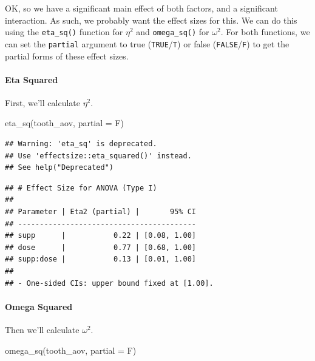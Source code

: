 \documentclass[
]{book}
\newenvironment{Shaded}{\begin{snugshade}}{\end{snugshade}}
\newcommand{\AttributeTok}[1]{\textcolor[rgb]{0.77,0.63,0.00}{#1}}
\newcommand{\FunctionTok}[1]{\textcolor[rgb]{0.00,0.00,0.00}{#1}}
\newcommand{\NormalTok}[1]{#1}
\begin{document}
OK, so we have a significant main effect of both factors, and a significant interaction. As such, we probably want the effect sizes for this. We can do this using the \texttt{eta\_sq()} function for \(\eta^2\) and \texttt{omega\_sq()} for \(\omega^2\). For both functions, we can set the \texttt{partial} argument to true (\texttt{TRUE}/\texttt{T}) or false (\texttt{FALSE}/\texttt{F}) to get the partial forms of these effect sizes.

\hypertarget{eta-squared}{%
\paragraph{Eta Squared}\label{eta-squared}}

First, we'll calculate \(\eta^2\).

\begin{Shaded}
\begin{Highlighting}[]
\FunctionTok{eta\_sq}\NormalTok{(tooth\_aov, }\AttributeTok{partial =}\NormalTok{ F)}
\end{Highlighting}
\end{Shaded}

\begin{verbatim}
## Warning: 'eta_sq' is deprecated.
## Use 'effectsize::eta_squared()' instead.
## See help("Deprecated")
\end{verbatim}

\begin{verbatim}
## # Effect Size for ANOVA (Type I)
## 
## Parameter | Eta2 (partial) |       95% CI
## -----------------------------------------
## supp      |           0.22 | [0.08, 1.00]
## dose      |           0.77 | [0.68, 1.00]
## supp:dose |           0.13 | [0.01, 1.00]
## 
## - One-sided CIs: upper bound fixed at [1.00].
\end{verbatim}

\hypertarget{omega-squared}{%
\paragraph{Omega Squared}\label{omega-squared}}

Then we'll calculate \(\omega^2\).

\begin{Shaded}
\begin{Highlighting}[]
\FunctionTok{omega\_sq}\NormalTok{(tooth\_aov, }\AttributeTok{partial =}\NormalTok{ F)}
\end{Highlighting}
\end{Shaded}
\end{document}
